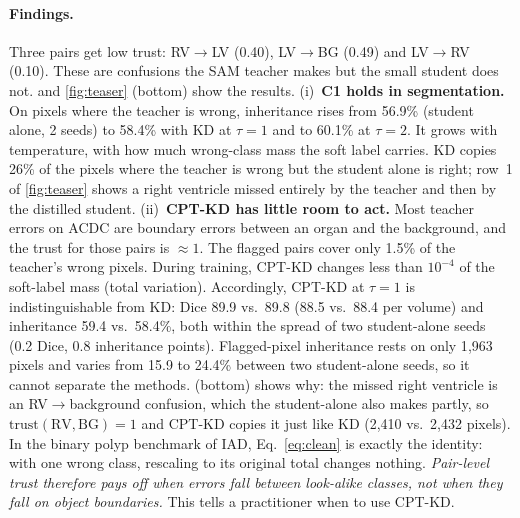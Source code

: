 \documentclass[10pt,twocolumn,letterpaper]{article}
\newcommand{\trust}{\mathrm{trust}}
\begin{document}
\paragraph{Findings.} Three pairs get low trust: RV$\to$LV (0.40), LV$\to$BG (0.49) and LV$\to$RV (0.10). These are confusions the SAM teacher makes but the small student does not.  and \cref{fig:teaser} (bottom) show the results.
(i)~\textbf{C1 holds in segmentation.} On pixels where the teacher is wrong, inheritance rises from 56.9\% (student alone, 2 seeds) to 58.4\% with KD at $\tau{=}1$ and to 60.1\% at $\tau{=}2$. It grows with temperature, \ie with how much wrong-class mass the soft label carries. KD copies 26\% of the pixels where the teacher is wrong but the student alone is right; row~1 of \cref{fig:teaser} shows a right ventricle missed entirely by the teacher and then by the distilled student.
(ii)~\textbf{CPT-KD has little room to act.} Most teacher errors on ACDC are boundary errors between an organ and the background, and the trust for those pairs is $\approx1$. The flagged pairs cover only 1.5\% of the teacher's wrong pixels. During training, CPT-KD changes less than $10^{-4}$ of the soft-label mass (total variation). Accordingly, CPT-KD at $\tau{=}1$ is indistinguishable from KD: Dice 89.9 vs.\ 89.8 (88.5 vs.\ 88.4 per volume) and inheritance 59.4 vs.\ 58.4\%, both within the spread of two student-alone seeds (0.2 Dice, 0.8 inheritance points). Flagged-pixel inheritance rests on only 1{,}963 pixels and varies from 15.9 to 24.4\% between two student-alone seeds, so it cannot separate the methods.  (bottom) shows why: the missed right ventricle is an RV$\to$background confusion, which the student-alone also makes partly, so $\trust(\text{RV},\text{BG}){=}1$ and CPT-KD copies it just like KD (2{,}410 vs.\ 2{,}432 pixels).
In the binary polyp benchmark of IAD, Eq.~\eqref{eq:clean} is exactly the identity: with one wrong class, rescaling to its original total changes nothing. \emph{Pair-level trust therefore pays off when errors fall between look-alike classes, not when they fall on object boundaries.} This tells a practitioner when to use CPT-KD.

\begin{table}[t]
\centering\scriptsize
\setlength{\tabcolsep}{2.4pt}
\caption{\textbf{ACDC} (SAM ViT-L $\to$ EfficientNet-B1). Dice: mean over RV/Myo/LV on the 416 test slices at $256^2$; vol.\ Dice: official per-volume protocol; Inh.: teacher-error inheritance over pixels; T-ok: pixel accuracy where the teacher is right. Mean $\pm$ std over the seeds listed; one seed per KD/CPT-KD configuration.}
\label{tab:acdc}
\resizebox{\linewidth}{!}{}
\end{table}
\end{document}
